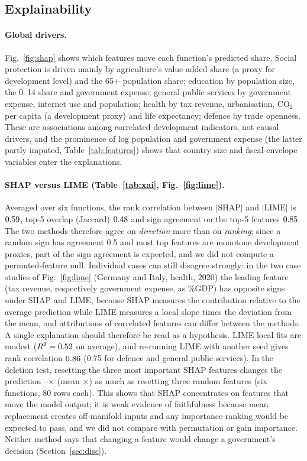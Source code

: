 \figWhatif

\subsection{Explainability}\label{sec:xai}
\paragraph{Global drivers.} Fig.~\ref{fig:shap} shows which features move each function's predicted share. Social protection is driven mainly by agriculture's value-added share (a proxy for development level) and the 65+ population share; education by population size, the 0--14 share and government expense; general public services by government expense, internet use and population; health by tax revenue, urbanisation, CO$_2$ per capita (a development proxy) and life expectancy; defence by trade openness. These are associations among correlated development indicators, not causal drivers, and the prominence of log population and government expense (the latter partly imputed, Table~\ref{tab:features}) shows that country size and fiscal-envelope variables enter the explanations.
\figShap
\paragraph{SHAP versus LIME (Table~\ref{tab:xai}, Fig.~\ref{fig:lime}).} Averaged over six functions, the rank correlation between $|\text{SHAP}|$ and $|\text{LIME}|$ is $0.59$, top-5 overlap (Jaccard) $0.48$ and sign agreement on the top-5 features $0.85$. The two methods therefore agree on \emph{direction} more than on \emph{ranking}; since a random sign has agreement 0.5 and most top features are monotone development proxies, part of the sign agreement is expected, and we did not compute a permuted-feature null. Individual cases can still disagree strongly: in the two case studies of Fig.~\ref{fig:lime} (Germany and Italy, health, 2020) the leading feature (tax revenue, respectively government expense, as \%GDP) has opposite signs under SHAP and LIME, because SHAP measures the contribution relative to the average prediction while LIME measures a local slope times the deviation from the mean, and attributions of correlated features can differ between the methods. A single explanation should therefore be read as a hypothesis. LIME local fits are modest ($R^2=0.52$ on average), and re-running LIME with another seed gives rank correlation $0.86$ (0.75 for defence and general public services). In the deletion test, resetting the three most important SHAP features changes the prediction \AgrFaithMin--\AgrFaithMax$\times$ (mean \AgrFaithMean$\times$) as much as resetting three random features (six functions, 80 rows each). This shows that SHAP concentrates on features that move the model output; it is weak evidence of faithfulness because mean replacement creates off-manifold inputs and any importance ranking would be expected to pass, and we did not compare with permutation or gain importance. Neither method says that changing a feature would change a government's decision (Section~\ref{sec:disc}).

\figLime
